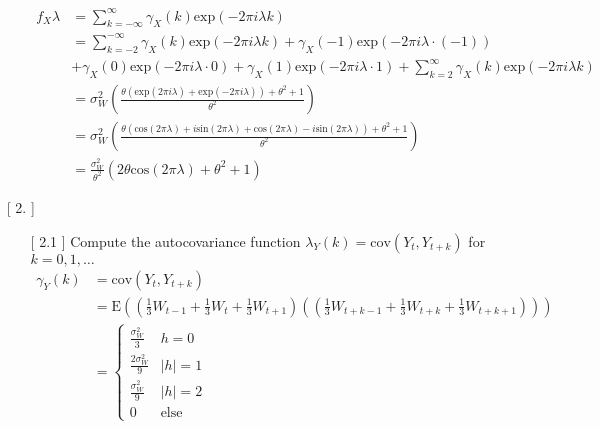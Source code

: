\documentclass[10pt,a4paper]{article}
\begin{document}
\begin{enumerate}
\begin{enumerate}
			\begin{align*}
				f_X{\lambda} &= \sum_{k=-\infty}^{\infty} \gamma_{X}(k) \text{exp}(-2\pi i \lambda k) \\
				&= \sum_{k=-2}^{-\infty} \gamma_{X}(k) \text{exp}(-2\pi i \lambda k) + \gamma_{X}(-1) \text{exp}(-2\pi i \lambda \cdot (-1)) \\
				&+ \gamma_{X}(0) \text{exp}(-2\pi i \lambda \cdot 0) + \gamma_{X}(1) \text{exp}(-2\pi i \lambda \cdot 1) + \sum_{k=2}^{\infty} \gamma_{X}(k) \text{exp}(-2\pi i \lambda k) \\
				&=  \sigma_{W}^2 \left( \frac{\theta (\text{exp}(2\pi i \lambda) + \text{exp}(-2\pi i \lambda) ) + \theta^2 + 1}{\theta^2}\right) \\
				&=\sigma_{W}^2 \left( \frac{\theta (\text{cos}(2\pi  \lambda) + i\text{sin}(2\pi  \lambda) + \text{cos}(2\pi \lambda) - i\text{sin}(2\pi \lambda)) + \theta^2 + 1}{\theta^2}\right) \\
				&= \frac{\sigma_{W}^2}{\theta^2}(2\theta \text{cos}(2 \pi \lambda)+\theta^2 +1)
			\end{align*}
			
			\end{enumerate}
	
	\item[[ 2.]]  \begin{enumerate}
		\item[[ 2.1]] Compute the autocovariance function $\lambda_Y(k) = \text{cov}(Y_t,Y_{t+k})$ for $k=0,1,\dots$
		\begin{align*}
			\gamma_{Y}(k) &= \text{cov}(Y_t, Y_{t+k}) \\
			&= \text{E}((\frac{1}{3}W_{t-1} + \frac{1}{3}W_t + \frac{1}{3}W_{t+1})((\frac{1}{3}W_{t+k-1} + \frac{1}{3}W_{t+k}  + \frac{1}{3}W_{t+k+1}))) \\
			&=  	\left\{
					\begin{array}{ll}
						\frac{\sigma_{W}^2}{3} & h=0\\
						\frac{2 \sigma_{W}^2}{9} & |h| = 1\\
						\frac{\sigma_{W}^2}{9} & |h| = 2 \\
						0 & \text{else}
					\end{array}
					\right.	
		\end{align*}
		

\end{enumerate}
\end{enumerate}
\end{document}
